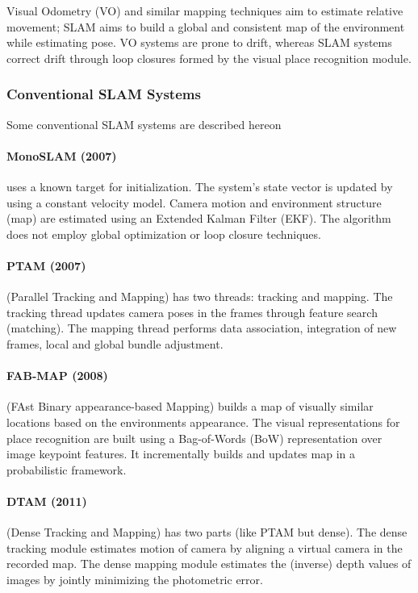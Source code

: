 Visual Odometry (VO) and similar mapping techniques aim to estimate
relative movement; SLAM aims to build a global and consistent map of
the environment while estimating pose. VO systems are prone to drift,
whereas SLAM systems correct drift through loop closures formed by the
visual place recognition module.


\subsubsection{Conventional SLAM Systems}

Some conventional SLAM systems are described hereon

\paragraph{MonoSLAM (2007) \cite{Davison2007MonoSLAMRS}} uses a known
target for initialization. The system's state vector is updated by
using a constant velocity model. Camera motion and environment
structure (map) are estimated using an Extended Kalman Filter (EKF).
The algorithm does not employ global optimization or loop closure
techniques.

\paragraph{PTAM (2007) \cite{Klein2007ParallelTA}} (Parallel Tracking
and Mapping) has two threads: tracking and mapping. The tracking
thread updates camera poses in the frames through feature search
(matching). The mapping thread performs data association, integration
of new frames, local and global bundle adjustment.

\paragraph{FAB-MAP (2008) \cite{Cummins2008FABMAPPL}} (FAst Binary
appearance-based Mapping) builds a map of visually similar locations
based on the environments appearance. The visual representations for
place recognition are built using a Bag-of-Words (BoW) representation
over image keypoint features. It incrementally builds and updates map
in a probabilistic framework.

\paragraph{DTAM (2011) \cite{Newcombe2011DTAMDT}} (Dense Tracking and
Mapping) has two parts (like PTAM but dense). The dense tracking
module estimates motion of camera by aligning a virtual camera in the
recorded map. The dense mapping module estimates the (inverse) depth
values of images by jointly minimizing the photometric error.

